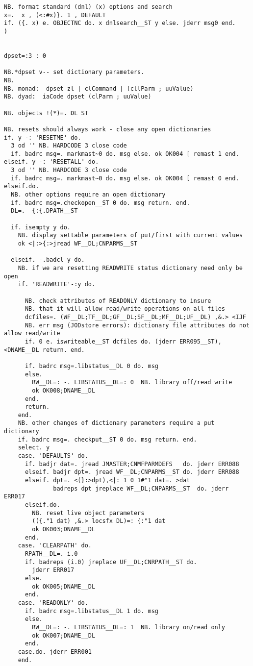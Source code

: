 \begin{lstlisting}[frame=single,framerule=0pt,basicstyle=\ttfamily\tiny]
NB. format standard (dnl) (x) options and search
x=.  x , (<:#x)}. 1 , DEFAULT
if. ({. x) e. OBJECTNC do. x dnlsearch__ST y else. jderr msg0 end.
)


dpset=:3 : 0

NB.*dpset v-- set dictionary parameters.
NB.
NB. monad:  dpset zl | clCommand | (cllParm ; uuValue)
NB. dyad:  iaCode dpset (clParm ; uuValue)

NB. objects !(*)=. DL ST

NB. resets should always work - close any open dictionaries
if. y -: 'RESETME' do.
  3 od '' NB. HARDCODE 3 close code
  if. badrc msg=. markmast~0 do. msg else. ok OK004 [ remast 1 end.
elseif. y -: 'RESETALL' do.
  3 od '' NB. HARDCODE 3 close code
  if. badrc msg=. markmast~0 do. msg else. ok OK004 [ remast 0 end.
elseif.do.
  NB. other options require an open dictionary
  if. badrc msg=.checkopen__ST 0 do. msg return. end.
  DL=.  {:{.DPATH__ST

  if. isempty y do.
    NB. display settable parameters of put/first with current values
    ok <|:>{:>jread WF__DL;CNPARMS__ST

  elseif. -.badcl y do.
    NB. if we are resetting READWRITE status dictionary need only be open
    if. 'READWRITE'-:y do.

      NB. check attributes of READONLY dictionary to insure 
      NB. that it will allow read/write operations on all files
      dcfiles=. (WF__DL;TF__DL;GF__DL;SF__DL;MF__DL;UF__DL) ,&.> <IJF
      NB. err msg (JODstore errors): dictionary file attributes do not allow read/write
      if. 0 e. iswriteable__ST dcfiles do. (jderr ERR095__ST),<DNAME__DL return. end.

      if. badrc msg=.libstatus__DL 0 do. msg
      else.
        RW__DL=: -. LIBSTATUS__DL=: 0  NB. library off/read write
        ok OK008;DNAME__DL
      end.
      return.
    end.
    NB. other changes of dictionary parameters require a put dictionary
    if. badrc msg=. checkput__ST 0 do. msg return. end.
    select. y
    case. 'DEFAULTS' do.
      if. badjr dat=. jread JMASTER;CNMFPARMDEFS   do. jderr ERR088
      elseif. badjr dpt=. jread WF__DL;CNPARMS__ST do. jderr ERR088
      elseif. dpt=. <(}:>dpt),<|: 1 0 1#"1 dat=. >dat
              badreps dpt jreplace WF__DL;CNPARMS__ST  do. jderr ERR017
      elseif.do.
        NB. reset live object parameters
        (({."1 dat) ,&.> locsfx DL)=: {:"1 dat
        ok OK003;DNAME__DL
      end.
    case. 'CLEARPATH' do.
      RPATH__DL=. i.0
      if. badreps (i.0) jreplace UF__DL;CNRPATH__ST do.
        jderr ERR017
      else.
        ok OK005;DNAME__DL
      end.
    case. 'READONLY' do.
      if. badrc msg=.libstatus__DL 1 do. msg
      else.
        RW__DL=: -. LIBSTATUS__DL=: 1  NB. library on/read only
        ok OK007;DNAME__DL
      end.
    case.do. jderr ERR001
    end.


\end{lstlisting}

